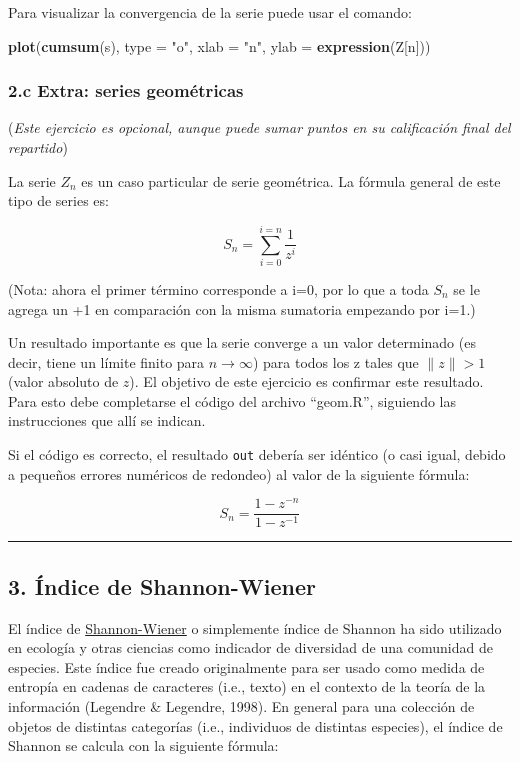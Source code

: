 \documentclass[]{article}
\newenvironment{Shaded}{}{}
\newcommand{\KeywordTok}[1]{\textcolor[rgb]{0.00,0.44,0.13}{\textbf{{#1}}}}
\newcommand{\DataTypeTok}[1]{\textcolor[rgb]{0.56,0.13,0.00}{{#1}}}
\newcommand{\StringTok}[1]{\textcolor[rgb]{0.25,0.44,0.63}{{#1}}}
\newcommand{\NormalTok}[1]{{#1}}
\begin{document}
Para visualizar la convergencia de la serie puede usar el comando:

\begin{Shaded}
\begin{Highlighting}[]
\KeywordTok{plot}\NormalTok{(}\KeywordTok{cumsum}\NormalTok{(s), }\DataTypeTok{type =} \StringTok{"o"}\NormalTok{, }\DataTypeTok{xlab =} \StringTok{"n"}\NormalTok{, }\DataTypeTok{ylab =} \KeywordTok{expression}\NormalTok{(Z[n]))}
\end{Highlighting}
\end{Shaded}
\subsubsection{2.c Extra: series geométricas}

(\emph{Este ejercicio es opcional, aunque puede sumar puntos en su
calificación final del repartido})

La serie $Z_n$ es un caso particular de serie geométrica. La fórmula
general de este tipo de series es:

\[S_n = \sum_{i=0}^{i=n} \frac{1}{z ^ i}\]

(Nota: ahora el primer término corresponde a i=0, por lo que a toda
$S_n$ se le agrega un +1 en comparación con la misma sumatoria empezando
por i=1.)

Un resultado importante es que la serie converge a un valor determinado
(es decir, tiene un límite finito para $n \to \infty$) para todos los z
tales que $\|z\| > 1$ (valor absoluto de $z$). El objetivo de este
ejercicio es confirmar este resultado. Para esto debe completarse el
código del archivo ``geom.R'', siguiendo las instrucciones que allí se
indican.

Si el código es correcto, el resultado \texttt{out} debería ser idéntico
(o casi igual, debido a pequeños errores numéricos de redondeo) al valor
de la siguiente fórmula:

\[S_n = \frac{1 - z ^ {- n}}{1 - z ^ {-1}}\]

\begin{center}\rule{3in}{0.4pt}\end{center}

\subsection{3. Índice de Shannon-Wiener}

El índice de
\href{https://es.wikipedia.org/wiki/\%C3\%8Dndice\_de\_Shannon}{Shannon-Wiener}
o simplemente índice de Shannon ha sido utilizado en ecología y otras
ciencias como indicador de diversidad de una comunidad de especies. Este
índice fue creado originalmente para ser usado como medida de entropía
en cadenas de caracteres (i.e., texto) en el contexto de la teoría de la
información (Legendre \& Legendre, 1998). En general para una colección
de objetos de distintas categorías (i.e., individuos de distintas
especies), el índice de Shannon se calcula con la siguiente fórmula:
\end{document}
